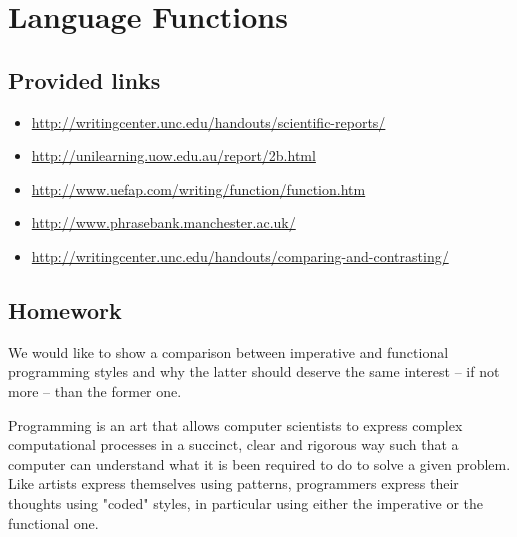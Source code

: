 
\chapter{Language Functions}

\section{Provided links}

\begin{itemize}
    \item \url{http://writingcenter.unc.edu/handouts/scientific-reports/}
    \item \url{http://unilearning.uow.edu.au/report/2b.html}
    \item \url{http://www.uefap.com/writing/function/function.htm}
    \item \url{http://www.phrasebank.manchester.ac.uk/}
    \item \url{http://writingcenter.unc.edu/handouts/comparing-and-contrasting/}
\end{itemize}

\section{Homework}

\iffalse


Imperative vs Functional style

state-oriented computation / lambda-calculus oriented
looping primitives / recursion
memory pointers / referential transparency
easy to grasp / hard to learn
difficult to reason about / allows theoretical studies

\fi

We would like to show a comparison between imperative and functional programming styles and why
the latter should deserve the same interest -- if not more -- than the
former one.

Programming is an art that allows computer scientists to express
complex computational processes in a succinct, clear and rigorous way
such that a computer can understand what it is been required to do to
solve a given problem. Like artists express themselves using
patterns, programmers express their thoughts using "coded" styles,
in particular using either the imperative or the functional one.


